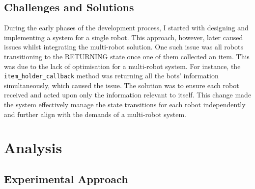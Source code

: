 \documentclass[conference]{IEEEtran}
\begin{document}
\subsection{Challenges and Solutions}
During the early phases of the development process, I started with designing and implementing a system for a single robot. This approach, however, later caused issues whilst integrating the multi-robot solution. One such issue was all robots transitioning to the RETURNING state once one of them collected an item. This was due to the lack of optimisation for a multi-robot system. For instance, the \texttt{item\_holder\_callback} method was returning all the bots' information simultaneously, which caused the issue. The solution was to ensure each robot received and acted upon only the information relevant to itself. This change made the system effectively manage the state transitions for each robot independently and further align with the demands of a multi-robot system.


\section{Analysis}
\subsection{Experimental Approach}


\end{document}
